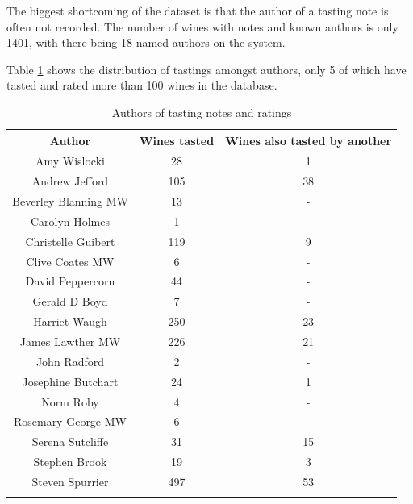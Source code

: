 
The biggest shortcoming of the dataset is that the author of a tasting note is often not recorded. The number of wines with notes and known authors is only 1401, with there being 18 named authors on the system. 

Table \ref{table:authors} shows the distribution of tastings amongst authors, only 5 of which have tasted and rated more than 100 wines in the database.

\begin{table}[ht]
    \caption{Authors of tasting notes and ratings}
    \centering
    \begin{tabular}{c c c}
        \\\hline\hline
        Author               & Wines tasted & Wines also tasted by another
        \\\hline
        Amy Wislocki         &           28 & 1  \\
        Andrew Jefford       &          105 & 38 \\
        Beverley Blanning MW &           13 & -  \\
        Carolyn Holmes       &            1 & -  \\
        Christelle Guibert   &          119 & 9  \\
        Clive Coates MW      &            6 & -  \\
        David Peppercorn     &           44 & -  \\
        Gerald D Boyd        &            7 & -  \\
        Harriet Waugh        &          250 & 23 \\
        James Lawther MW     &          226 & 21 \\
        John Radford         &            2 & -  \\
        Josephine Butchart   &           24 & 1  \\
        Norm Roby            &            4 & -  \\
        Rosemary George MW   &            6 & -  \\
        Serena Sutcliffe     &           31 & 15 \\
        Stephen Brook        &           19 & 3  \\
        Steven Spurrier      &          497 & 53 \\
        \\\hline
    \end{tabular}
    \label{table:authors}
\end{table}

